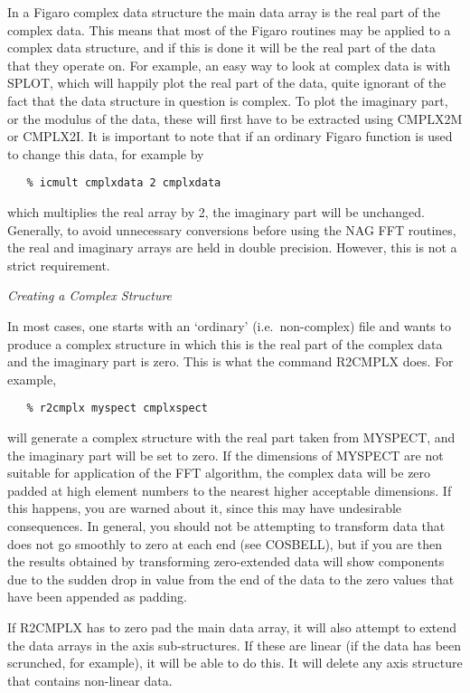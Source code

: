 In a Figaro complex data structure the main data array is the real
part of the complex data. 
This means that most of the Figaro routines may be applied to a complex data
structure, and if this is done it will be the real part of the data that
they operate on.  For example, an easy way to look at complex data is
with SPLOT, which will happily plot the real part of the data, quite
ignorant of the fact that the data structure in question is complex.  To
plot the imaginary part, or the modulus of the data, these will first have 
to be extracted using CMPLX2M or CMPLX2I.  It is important to note that 
if an ordinary
Figaro function is used to change this data, for example by

\begin{verbatim}
   % icmult cmplxdata 2 cmplxdata
\end{verbatim}

which multiplies the real array by 2, the imaginary part will be unchanged.
Generally, to avoid unnecessary
conversions before using the NAG FFT routines, the real and imaginary
arrays are held in double precision. However, this is not a strict requirement.


\goodbreak
\vspace{12pt}
{\it Creating a Complex Structure}

In most cases, one starts with an `ordinary' (i.e.\ non-complex) 
file and wants to produce a complex structure in which this is the real
part of the complex data and the imaginary part is zero.  This is what the
command R2CMPLX does.  For example,

\begin{verbatim}
   % r2cmplx myspect cmplxspect
\end{verbatim}

will generate a complex structure with the real part taken from MYSPECT,
and the imaginary part will be set to zero.
If the dimensions of MYSPECT are not suitable for application
of the FFT algorithm, the complex data will be zero padded at high element
numbers to the nearest higher acceptable dimensions.  If this happens,
you are warned about it, since this may have undesirable consequences.
In general, you should not be attempting to transform data that does not
go smoothly to zero at each end (see COSBELL), but if you are then the
results obtained by transforming zero-extended data will show components
due to the sudden drop in value from the end of the data to the zero
values that have been appended as padding.  

If R2CMPLX has to zero pad the main data array, it will also attempt
to extend the data arrays in the axis sub-structures. If
these are linear (if the data has been scrunched, for example), it will be
able to do this.  It will delete any axis structure that contains
non-linear data.

